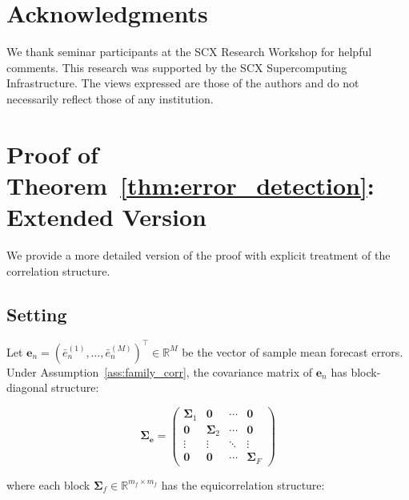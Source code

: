 \documentclass[12pt,a4paper]{article}
\begin{document}
\section*{Acknowledgments}
We thank seminar participants at the SCX Research Workshop for
helpful comments.  This research was supported by the SCX
Supercomputing Infrastructure.  The views expressed are those of
the authors and do not necessarily reflect those of any
institution.

\appendix

\section{Proof of Theorem~\ref{thm:error_detection}: Extended Version}
\label{app:thm1_extended}

We provide a more detailed version of the proof with explicit
treatment of the correlation structure.

\subsection{Setting}

Let $\mathbf{e}_n = (\bar{e}_n^{(1)}, \ldots, \bar{e}_n^{(M)})^\top
\in \mathbb{R}^M$ be the vector of sample mean forecast errors.  Under
Assumption~\ref{ass:family_corr}, the covariance matrix of
$\mathbf{e}_n$ has block-diagonal structure:

\begin{equation}
    \mathbf{\Sigma}_{\mathbf{e}} = \begin{pmatrix}
        \mathbf{\Sigma}_1 & \mathbf{0} & \cdots & \mathbf{0} \\
        \mathbf{0} & \mathbf{\Sigma}_2 & \cdots & \mathbf{0} \\
        \vdots & \vdots & \ddots & \vdots \\
        \mathbf{0} & \mathbf{0} & \cdots & \mathbf{\Sigma}_F
    \end{pmatrix} \label{eq:sigma_block}
\end{equation}

where each block $\mathbf{\Sigma}_f \in \mathbb{R}^{m_f \times m_f}$
has the equicorrelation structure:
\end{document}
